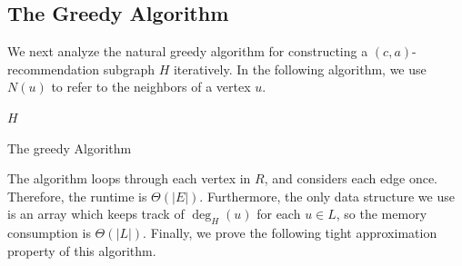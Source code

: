 \subsection{The Greedy Algorithm}
\label{greedy}

We next analyze the natural greedy algorithm for constructing a $(c,a)$-recommendation
subgraph $H$ iteratively. In the following algorithm, we use $N(u)$ to refer to the neighbors
of a vertex $u$. \vspace{0.05in}

\begin{algorithm}[h]
  \SetAlgoLined
  \Return $H$\;
  \caption{The greedy Algorithm}
\end{algorithm}\vs

The algorithm loops through each vertex in $R$, and considers each edge once.
Therefore, the runtime is $\Theta(|E|)$. Furthermore, the only data structure
we use is an array which keeps track of $\deg_H(u)$ for each $u\in L$, so the
memory consumption is $\Theta(|L|)$. Finally, we prove the following tight
approximation property of this algorithm.

